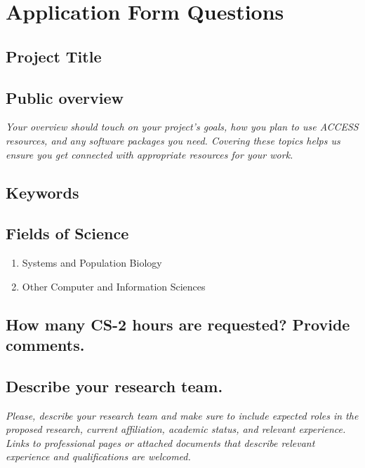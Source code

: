 \section{Application Form Questions}

\subsection{Project Title}

\subsection{Public overview}

\begin{displayquote} \itshape
Your overview should touch on your project's goals, how you plan to use ACCESS resources, and any software packages you need.
Covering these topics helps us ensure you get connected with appropriate resources for your work.
\end{displayquote}

\subsection{Keywords}

\subsection{Fields of Science}

\begin{enumerate}
    \item Systems and Population Biology
    \item Other Computer and Information Sciences
\end{enumerate}

\subsection{How many CS-2 hours are requested? Provide comments.}

\subsection{Describe your research team.}

\begin{displayquote} \itshape
Please, describe your research team and make sure to include expected roles in the proposed research, current affiliation, academic status, and relevant experience.
Links to professional pages or attached documents that describe relevant experience and qualifications are welcomed.
\end{displayquote}

